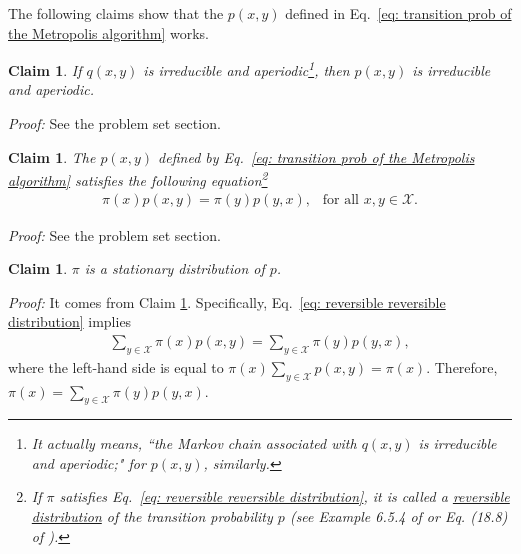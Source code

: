 \documentclass[11pt,letterpaper, leqno]{article}
\newtheorem{claim}[theorem]{Claim}
\numberwithin{equation}{section}
\numberwithin{theorem}{section}
\numberwithin{lemma}{section}
\numberwithin{corollary}{section}
\numberwithin{definition}{section}
\numberwithin{proposition}{section}
\numberwithin{remark}{section}
\numberwithin{example}{section}
\begin{document}
The following claims show that the $p(x,y)$ defined in Eq.~\eqref{eq: transition prob of the Metropolis algorithm} works.
\begin{claim}\label{claim 1}
If $q(x,y)$ is irreducible and aperiodic\footnote{It actually means, ``the Markov chain associated with $q(x,y)$ is irreducible and aperiodic;" for $p(x,y)$, similarly.}, then $p(x,y)$ is irreducible and aperiodic.
\end{claim}

\emph{Proof:} See the problem set section.

\begin{claim}\label{claim 2}
The $p(x,y)$ defined by Eq.~\eqref{eq: transition prob of the Metropolis algorithm} satisfies the following equation\footnote{If $\pi$ satisfies Eq.~\eqref{eq: reversible reversible distribution}, it is called a \href{https://inst.eecs.berkeley.edu/~ee126/sp18/reversibility.pdf}{reversible distribution} of the transition probability $p$ (see Example 6.5.4 of \cite{durrett2019probability} or Eq. (18.8) of \cite{klenke2013probability}).}
\begin{align}\label{eq: reversible reversible distribution}
    \pi(x)p(x,y)=\pi(y)p(y,x),\ \ \mbox{ for all }x,y\in\mathcal{X}.
\end{align}
\end{claim}

\emph{Proof:} See the problem set section.

\begin{claim}\label{claim 3}
$\pi$ is a stationary distribution of $p$.
\end{claim}

\emph{Proof:} It comes from Claim \ref{claim 2}. Specifically, Eq.~\eqref{eq: reversible reversible distribution} implies
    \begin{align*}
        \sum_{y\in\mathcal{X}}\pi(x)p(x,y)=\sum_{y\in\mathcal{X}}\pi(y)p(y,x),
    \end{align*}
    where the left-hand side is equal to $\pi(x) \sum_{y\in\mathcal{X}} p(x,y)=\pi(x)$. Therefore, $\pi(x) = \sum_{y\in\mathcal{X}}\pi(y)p(y,x)$.
\end{document}
